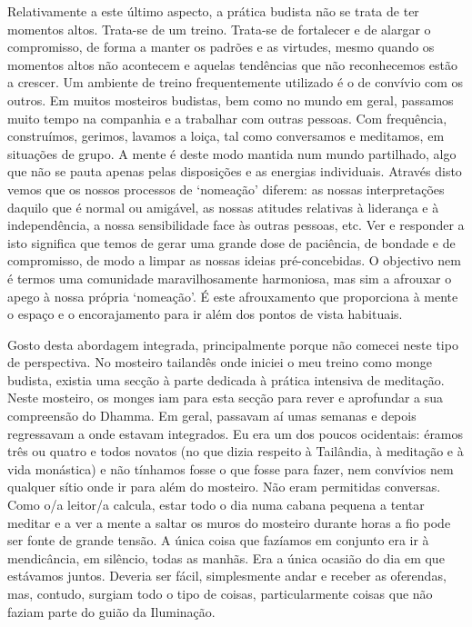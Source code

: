 Relativamente a este último aspecto, a prática budista não se trata de ter momentos altos. Trata-se de um treino. Trata-se de fortalecer e de alargar o compromisso, de forma a manter os padrões e as virtudes, mesmo quando os momentos altos não acontecem e aquelas tendências que não reconhecemos estão a crescer. Um ambiente de treino frequentemente utilizado é o de convívio com os outros. Em muitos mosteiros budistas, bem como no mundo em geral, passamos muito tempo na companhia e a trabalhar com outras pessoas. Com frequência, construímos, gerimos, lavamos a loiça, tal como conversamos e meditamos, em situações de grupo. A mente é deste modo mantida num mundo partilhado, algo que não se pauta apenas pelas disposições e as energias individuais. Através disto vemos que os nossos processos de `nomeação' diferem: as nossas interpretações daquilo que é normal ou amigável, as nossas atitudes relativas à liderança e à independência, a nossa sensibilidade face às outras pessoas, etc. Ver e responder a isto significa que temos de gerar uma grande dose de paciência, de bondade e de compromisso, de modo a limpar as nossas ideias pré-concebidas. O objectivo nem é termos uma comunidade maravilhosamente harmoniosa, mas sim a afrouxar o apego à nossa própria `nomeação'. É este afrouxamento que proporciona à mente o espaço e o encorajamento para ir além dos pontos de vista habituais.

Gosto desta abordagem integrada, principalmente porque não comecei neste tipo de perspectiva. No mosteiro tailandês onde iniciei o meu treino como monge budista, existia uma secção à parte dedicada à prática intensiva de meditação. Neste mosteiro, os monges iam para esta secção para rever e aprofundar a sua compreensão do Dhamma. Em geral, passavam aí umas semanas e depois regressavam a onde estavam integrados. Eu era um dos poucos ocidentais: éramos três ou quatro e todos novatos (no que dizia respeito à Tailândia, à meditação e à vida monástica) e não tínhamos fosse o que fosse para fazer, nem convívios nem qualquer sítio onde ir para além do mosteiro. Não eram permitidas conversas. Como o/a leitor/a calcula, estar todo o dia numa cabana pequena a tentar meditar e a ver a mente a saltar os muros do mosteiro durante horas a fio pode ser fonte de grande tensão. A única coisa que fazíamos em conjunto era ir à mendicância, em silêncio, todas as manhãs. Era a única ocasião do dia em que estávamos juntos. Deveria ser fácil, simplesmente andar e receber as oferendas, mas, contudo, surgiam todo o tipo de coisas, particularmente coisas que não faziam parte do guião da Iluminação.

